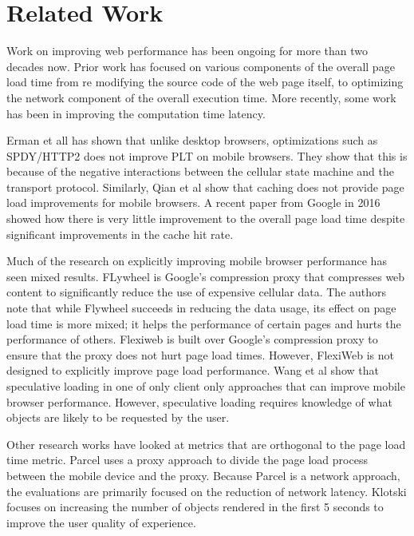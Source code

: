 \section{Related Work}
\label{sec:related}

Work on improving web performance has been ongoing for more than two decades now. 
Prior work has focused on various components of the overall page load time
from re modifying the source code of the web page itself, to optimizing the
network component of the overall execution time. More recently, some work
has been in improving the computation time latency. 

Erman et all \cite{erman2013conext} %
has shown that unlike desktop browsers, optimizations such as SPDY/HTTP2 does not improve
PLT on mobile browsers. They show that this is because of the negative interactions
between the cellular state machine and the transport protocol. Similarly, Qian
et al \cite{quian2012mobisys} %
show that caching does not provide
page load improvements for mobile browsers. 
A recent paper from Google in 2016 \cite{vesuna2016caching} %
showed how there is very little improvement to the overall page load time despite 
significant improvements in the cache hit rate. 

Much of the research on explicitly improving mobile browser performance has seen mixed results.
FLywheel \cite{agababov2015nsdi} is Google's compression proxy that compresses web content to significantly 
reduce the use of expensive cellular data. The authors note that while Flywheel succeeds in
reducing the data usage, its effect on page load time is more mixed; it helps
the performance of certain pages and hurts the performance of others. Flexiweb \cite{singh2015mobicom} is built over
Google's compression proxy to ensure that the proxy does not hurt page load times. However, FlexiWeb
is not designed to explicitly improve page load performance. Wang et al \cite{wang2013demystifying} show that
speculative loading in one of only client only approaches that can improve mobile
browser performance. However, speculative loading requires knowledge of what objects are likely
to be requested by the user. 

Other research works have looked at metrics that are orthogonal to the page load time metric. Parcel
\cite{sivakumar2014conext} %
 uses a proxy
approach to divide the page load process between the mobile device and the proxy. Because Parcel is
a network approach, the evaluations are primarily focused on the reduction of network
latency. Klotski \cite{butkiewicz2015usenix} focuses on increasing the number of objects rendered in the first
5 seconds to improve the user quality of experience. 

